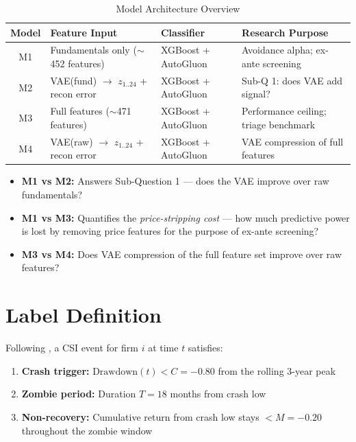 \documentclass{report}\usepackage[]{graphicx}\usepackage[table]{xcolor}
\begin{document}
\begin{table}[H]
\centering
\caption{Model Architecture Overview}
\begin{tabular}{clll}
\toprule
\textbf{Model} & \textbf{Feature Input} & \textbf{Classifier} & \textbf{Research Purpose} \\
\midrule
M1 & Fundamentals only ($\sim$452 features) & XGBoost + AutoGluon & Avoidance alpha; ex-ante screening \\
M2 & VAE(fund) $\rightarrow$ $z_{1..24}$ + recon error & XGBoost + AutoGluon & Sub-Q 1: does VAE add signal? \\
M3 & Full features ($\sim$471 features) & XGBoost + AutoGluon & Performance ceiling; triage benchmark \\
M4 & VAE(raw) $\rightarrow$ $z_{1..24}$ + recon error & XGBoost + AutoGluon & VAE compression of full features \\
\bottomrule
\end{tabular}
\end{table}

\begin{itemize}
    \item \textbf{M1 vs M2:} Answers Sub-Question 1 — does the VAE improve over raw fundamentals?
    \item \textbf{M1 vs M3:} Quantifies the \textit{price-stripping cost} — how much predictive 
    power is lost by removing price features for the purpose of ex-ante screening?
    \item \textbf{M3 vs M4:} Does VAE compression of the full feature set improve over raw features?
\end{itemize}

\section{Label Definition}

Following \citet{Tewari2024}, a CSI event for firm $i$ at time $t$ satisfies:

\begin{enumerate}
    \item \textbf{Crash trigger:} $\text{Drawdown}(t) < C = -0.80$ from the rolling 3-year peak
    \item \textbf{Zombie period:} Duration $T = 18$ months from crash low
    \item \textbf{Non-recovery:} Cumulative return from crash low stays $< M = -0.20$ 
    throughout the zombie window
\end{enumerate}
\end{document}
